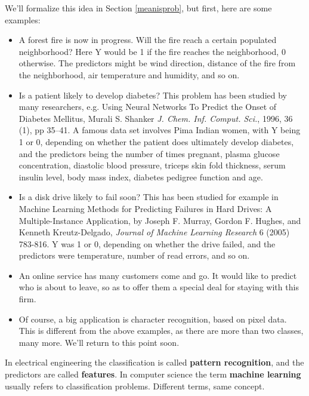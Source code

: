 We'll formalize this idea in Section \ref{meanisprob}, but first,
here are some examples:

\begin{itemize}

\item A forest fire is now in progress.  Will the fire reach a certain
populated neighborhood?  Here Y would be 1 if the fire reaches the
neighborhood, 0 otherwise.  The predictors might be wind direction,
distance of the fire from the neighborhood, air temperature and
humidity, and so on.

\item Is a patient likely to develop diabetes?  This problem has been
studied by many researchers, e.g.  Using Neural Networks To Predict the
Onset of Diabetes Mellitus, Murali S. Shanker {\it J. Chem. Inf. Comput.
Sci.}, 1996, 36 (1), pp 35–41.  A famous data set involves Pima Indian
women, with Y being 1 or 0, depending on whether the patient does
ultimately develop diabetes, and the predictors being the number of
times pregnant, plasma glucose concentration, diastolic blood pressure,
triceps skin fold thickness, serum insulin level, body mass index,
diabetes pedigree function and age. 

\item Is a disk drive likely to fail soon?  This has been studied for
example in Machine Learning Methods for Predicting Failures in Hard
Drives: A Multiple-Instance Application, by Joseph F. Murray, Gordon F.
Hughes, and Kenneth Kreutz-Delgado, {\it Journal of Machine Learning
Research} 6 (2005) 783-816.  Y was 1 or 0, depending on whether the
drive failed, and the predictors were temperature, number of read
errors, and so on.

\item An online service has many customers come and go.  It would like
to predict who is about to leave, so as to offer them a special deal for
staying with this firm.

\item Of course, a big application is character recognition, based on
pixel data.  This is different from the above examples, as there are
more than two classes, many more.  We'll return to this point soon.

\end{itemize}

In electrical engineering the classification is called {\bf pattern
recognition}, and the predictors are called {\bf features}.  In computer
science the term {\bf machine learning} usually refers to classification
problems.  Different terms, same concept.

